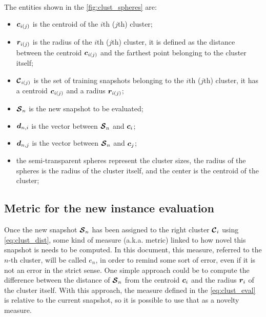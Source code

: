\paragraph*{}
The entities shown in the \autoref{fig:clust_spheres} are:
\begin{itemize}
  \item $\bm{c}_{i(j)}$ is the centroid of the $i$th ($j$th) cluster;
  \item $\bm{r}_{i(j)}$ is the radius of the $i$th ($j$th) cluster, it is defined as the distance between the centroid $\bm{c}_{i(j)}$ and the farthest point belonging to the cluster itself;
  \item $\bm{\mathcal{C}}_{i(j)}$ is the set of training snapshots belonging to the $i$th ($j$th) cluster, it has a centroid $\bm{c}_{i(j)}$ and a radius $\bm{r}_{i(j)}$;
  \item $\bm{\mathcal{S}}_n$ is the new snapshot to be evaluated;
  \item $\bm{d}_{n,i}$ is the vector between $\bm{\mathcal{S}}_n$ and $\bm{c}_i$;
  \item $\bm{d}_{n,j}$ is the vector between $\bm{\mathcal{S}}_n$ and $\bm{c}_j$;
  \item the semi-transparent spheres represent the cluster sizes, the radius of the spheres is the radius of the cluster itself, and the center is the centroid of the cluster;
\end{itemize}



\subsection{Metric for the new instance evaluation}
Once the new snapshot $\bm{\mathcal{S}}_n$ has been assigned to the right cluster $\bm{\mathcal{C}}_i$ using \autoref{eq:clust_dist}, some kind of measure (a.k.a. metric) linked to how novel this snapshot is needs to be computed. In this document, this measure, referred to the $n$-th cluster, will be called $e_n$, in order to remind some sort of error, even if it is not an error in the strict sense. One simple approach could be to compute the difference between the distance of $\bm{\mathcal{S}}_n$ from the centroid $\bm{c}_i$ and the radius $\bm{r}_i$ of the cluster itself. With this approach, the measure defined in the \autoref{eq:clust_eval} is relative to the current snapshot, so it is possible to use that as a novelty measure.

